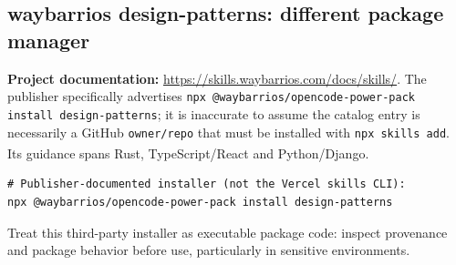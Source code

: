 \documentclass[11pt,letterpaper]{article}
\newcommand{\src}[1]{\textsuperscript{\textcolor{teal}{\cite{#1}}}}
\begin{document}
\subsection{waybarrios design-patterns: different package manager}
\textbf{Project documentation:} \url{https://skills.waybarrios.com/docs/skills/}. The publisher specifically advertises \texttt{npx @waybarrios/opencode-power-pack install design-patterns}; it is inaccurate to assume the catalog entry is necessarily a GitHub \texttt{owner/repo} that must be installed with \texttt{npx skills add}. Its guidance spans Rust, TypeScript/React and Python/Django.\src{waybarrios}
\begin{verbatim}
# Publisher-documented installer (not the Vercel skills CLI):
npx @waybarrios/opencode-power-pack install design-patterns
\end{verbatim}
Treat this third-party installer as executable package code: inspect provenance and package behavior before use, particularly in sensitive environments.
\end{document}
